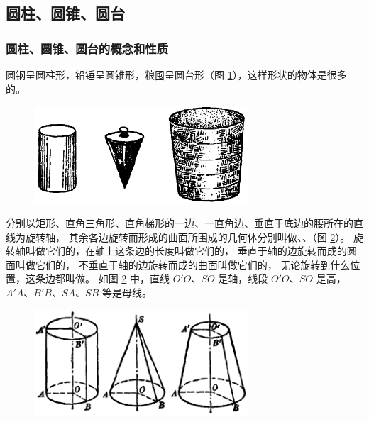 \subsection{圆柱、圆锥、圆台}\label{subsec:2-4}

\begin{enhancedline}

\subsubsection{圆柱、圆锥、圆台的概念和性质}

圆钢呈圆柱形，铅锤呈圆锥形，粮囤呈圆台形（图 \ref{fig:ltjh-2-30}），这样形状的物体是很多的。

\begin{figure}[htbp]
    \centering
    \includegraphics[width=8cm]{../pic/ltjh-ch2-30.png}
    \caption{}\label{fig:ltjh-2-30}
\end{figure}

分别以矩形、直角三角形、直角梯形的一边、一直角边、垂直于底边的腰所在的直线为旋转轴，
其余各边旋转而形成的曲面所围成的几何体分别叫做、、（图 \ref{fig:ltjh-2-31}）。
旋转轴叫做它们的，在轴上这条边的长度叫做它们的，
垂直于轴的边旋转而成的圆面叫做它们的，
不垂直于轴的边旋转而成的曲面叫做它们的，
无论旋转到什么位置，这条边都叫做。
如图 \ref{fig:ltjh-2-31} 中，直线 $O'O$、$SO$ 是轴，线段 $O'O$、$SO$ 是高，$A'A$、$B'B$、$SA$、$SB$ 等是母线。

\begin{figure}[htbp]
    \centering
    \includegraphics[width=8cm]{../pic/ltjh-ch2-31.png}
    \caption{}\label{fig:ltjh-2-31}
\end{figure}



\end{enhancedline}
